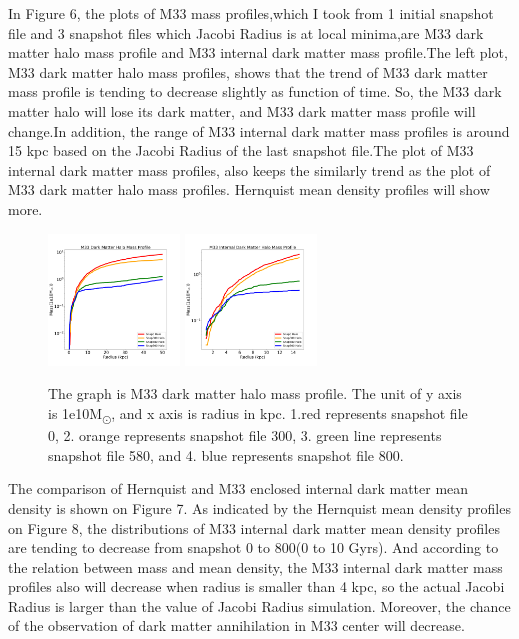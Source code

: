 \documentclass[twocolumn]{aastex63}
\begin{document}
\indent In Figure 6, the plots of M33 mass profiles,which I took from 1 initial snapshot file and 3 snapshot files which Jacobi Radius is at local minima,are M33 dark matter halo mass profile and M33 internal dark matter mass profile.The left plot, M33 dark matter halo mass profiles, shows that the trend of M33 dark matter mass profile is tending to decrease slightly as function of time. So, the M33 dark matter halo will lose its dark matter, and M33 dark matter mass profile will change.In addition, the range of M33 internal dark matter mass profiles is around 15 kpc based on the Jacobi Radius of the last snapshot file.The plot of M33 internal dark matter mass profiles, also keeps the similarly trend as the plot of M33 dark matter halo mass profiles. Hernquist mean density profiles will show more.
\begin{figure}[H]
    \includegraphics[width=3.5cm]{MassProfile_M33Halo.png}\hfill
    \includegraphics[width=3.5cm]{MassProfile_InternalM33Halo.png}\hfill
    \caption{The graph is M33 dark matter halo mass profile. The unit of y axis is 1e10M\textsubscript{\(\odot\)}, and x axis is radius in kpc. 1.red represents  snapshot file 0, 2. orange represents snapshot file 300, 3. green line represents snapshot file 580, and 4. blue represents snapshot file 800.}
\end{figure}
The comparison of Hernquist and M33 enclosed internal dark matter mean density is shown on Figure 7. As indicated by the Hernquist mean density profiles on Figure 8, the distributions of M33 internal dark matter mean density profiles are tending to decrease from snapshot 0 to 800(0 to 10 Gyrs). And according to the relation between mass and mean density, the M33 internal dark matter mass profiles also will decrease when radius is smaller than 4 kpc, so the actual Jacobi Radius is larger than the value of Jacobi Radius simulation. Moreover, the chance of the observation of dark matter annihilation in M33 center will decrease. 
\end{document}
